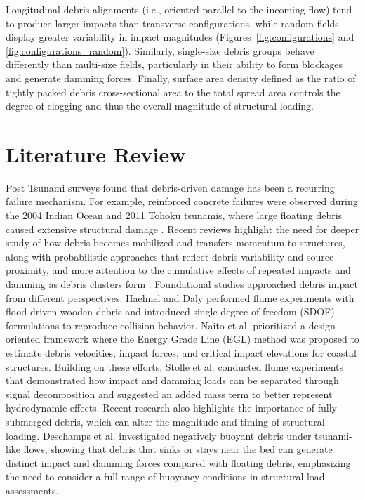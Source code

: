 \documentclass{article}
\begin{document}
Longitudinal debris alignments (i.e., oriented parallel to the incoming flow) tend to produce larger impacts than transverse configurations, while random fields display greater variability in impact magnitudes (Figures~\ref{fig:configurations} and \ref{fig:configurations_random}). Similarly, single-size debris groups behave differently than multi-size fields, particularly in their ability to form blockages and generate damming forces. Finally, surface area density defined as the ratio of tightly packed debris cross-sectional area to the total spread area controls the degree of clogging and thus the overall magnitude of structural loading.

\section{Literature Review} Post Tsunami surveys found that debris-driven damage has been a recurring failure mechanism. For example, reinforced concrete failures were observed during the 2004 Indian Ocean and 2011 Tohoku tsunamis, where large floating debris caused extensive structural damage \citep{Leonard2011,Akiyama2013}. Recent reviews highlight the need for deeper study of how debris becomes mobilized and transfers momentum to structures, along with probabilistic approaches that reflect debris variability and source proximity, and more attention to the cumulative effects of repeated impacts and damming as debris clusters form \citep{nistorTsunamiDrivenDebrisMotion2017}.
Foundational studies approached debris impact from different perspectives. Haehnel and Daly \citep{Haehnel2004} performed flume experiments with flood-driven wooden debris and introduced single-degree-of-freedom (SDOF) formulations to reproduce collision behavior. Naito et al. \citep{Naito2016} prioritized a design-oriented framework where the Energy Grade Line (EGL) method was proposed to estimate debris velocities, impact forces, and critical impact elevations for coastal structures. Building on these efforts, Stolle et al. \citep{Stolle2018,Stolle2019} conducted flume experiments that demonstrated how impact and damming loads can be separated through signal decomposition and suggested an added mass term to better represent hydrodynamic effects. Recent research also highlights the importance of  fully submerged debris, which can alter the magnitude and timing of structural loading. Deschamps et al. \citep{deschampsNegativelyBuoyantDebris2025} investigated negatively buoyant debris under tsunami-like flows, showing that debris that sinks or stays near the bed can generate distinct impact and damming forces compared with floating debris, emphasizing the need to consider a full range of buoyancy conditions in structural load assessments.
\end{document}
